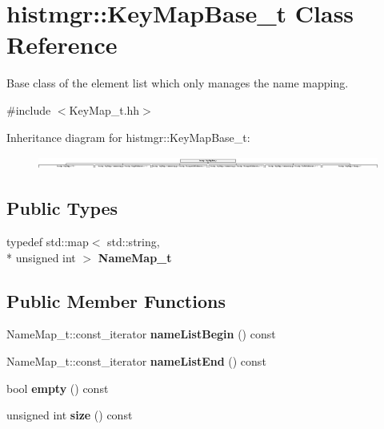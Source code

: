 \section{histmgr\-:\-:Key\-Map\-Base\-\_\-t Class Reference}
\label{classhistmgr_1_1KeyMapBase__t}


Base class of the element list which only manages the name mapping.  




{\ttfamily \#include $<$Key\-Map\-\_\-t.\-hh$>$}

Inheritance diagram for histmgr\-:\-:Key\-Map\-Base\-\_\-t\-:\begin{figure}[H]
\begin{center}
\leavevmode
\includegraphics[height=0.425209cm]{classhistmgr_1_1KeyMapBase__t}
\end{center}
\end{figure}
\subsection*{Public Types}
\begin{DoxyCompactItemize}
\item 
typedef std\-::map$<$ std\-::string, \\*
unsigned int $>$ {\bfseries Name\-Map\-\_\-t}\label{classhistmgr_1_1KeyMapBase__t_ae49c6a47e8e2391af4a57a3dc1f40020}

\end{DoxyCompactItemize}
\subsection*{Public Member Functions}
\begin{DoxyCompactItemize}
\item 
Name\-Map\-\_\-t\-::const\-\_\-iterator {\bfseries name\-List\-Begin} () const \label{classhistmgr_1_1KeyMapBase__t_af1bc65af4564e7cd74c6ab25b35ca9e5}

\item 
Name\-Map\-\_\-t\-::const\-\_\-iterator {\bfseries name\-List\-End} () const \label{classhistmgr_1_1KeyMapBase__t_aac7ea5403cabbabff2a01dc108072f1f}

\item 
bool {\bfseries empty} () const \label{classhistmgr_1_1KeyMapBase__t_a63938a3f927f441c92a91467eee12fa4}

\item 
unsigned int {\bfseries size} () const \label{classhistmgr_1_1KeyMapBase__t_abe4ee7508376462845afcfe84ce92672}

\end{DoxyCompactItemize}
